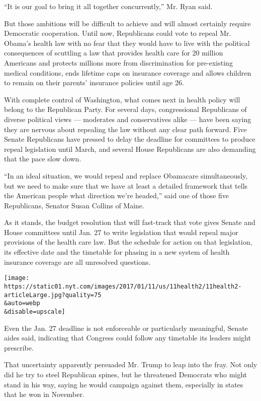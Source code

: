 ``It is our goal to bring it all together concurrently,'' Mr. Ryan said.

But those ambitions will be difficult to achieve and will almost
certainly require Democratic cooperation. Until now, Republicans could
vote to repeal Mr. Obama's health law with no fear that they would have
to live with the political consequences of scuttling a law that provides
health care for 20 million Americans and protects millions more from
discrimination for pre-existing medical conditions, ends lifetime caps
on insurance coverage and allows children to remain on their parents'
insurance policies until age 26.

With complete control of Washington, what comes next in health policy
will belong to the Republican Party. For several days, congressional
Republicans of diverse political views --- moderates and conservatives
alike --- have been saying they are nervous about repealing the law
without any clear path forward. Five Senate Republicans have pressed to
delay the deadline for committees to produce repeal legislation until
March, and several House Republicans are also demanding that the pace
slow down.

``In an ideal situation, we would repeal and replace Obamacare
simultaneously, but we need to make sure that we have at least a
detailed framework that tells the American people what direction we're
headed,'' said one of those five Republicans, Senator Susan Collins of
Maine.

As it stands, the budget resolution that will fast-track that vote gives
Senate and House committees until Jan. 27 to write legislation that
would repeal major provisions of the health care law. But the schedule
for action on that legislation, its effective date and the timetable for
phasing in a new system of health insurance coverage are all unresolved
questions.

\texttt{[image: https://static01.nyt.com/images/2017/01/11/us/11health2/11health2-articleLarge.jpg?quality=75\\\&auto=webp\\\&disable=upscale]}

Even the Jan. 27 deadline is not enforceable or particularly meaningful,
Senate aides said, indicating that Congress could follow any timetable
its leaders might prescribe.

That uncertainty apparently persuaded Mr. Trump to leap into the fray.
Not only did he try to steel Republican spines, but he threatened
Democrats who might stand in his way, saying he would campaign against
them, especially in states that he won in November.

